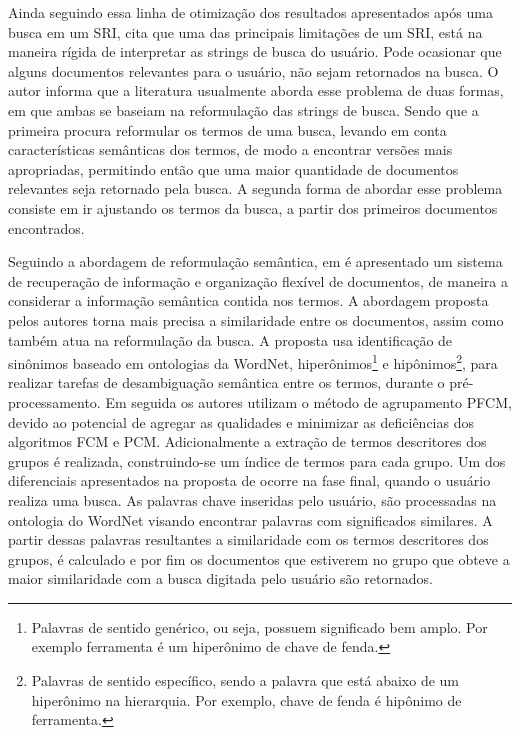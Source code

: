 Ainda seguindo essa linha de otimização dos resultados apresentados após uma busca em um SRI,
\cite{Nogueira2012} cita que uma das principais limitações de um SRI, está na maneira rígida de
interpretar as strings de busca do usuário. Pode ocasionar que alguns documentos relevantes
para o usuário, não sejam retornados na busca. O autor informa que a literatura usualmente aborda
esse problema de duas formas, em que ambas se baseiam na reformulação das strings de busca. Sendo
que a primeira procura reformular os termos de uma busca, levando em conta características
semânticas dos termos, de modo a encontrar versões mais apropriadas, permitindo então que uma maior
quantidade de documentos relevantes seja retornado pela busca. A segunda forma de abordar esse
problema consiste em ir ajustando os termos da busca, a partir dos primeiros documentos encontrados.

Seguindo a abordagem de reformulação semântica, em \cite{Murali2015} é apresentado um 
sistema de recuperação de informação e organização flexível de
documentos, de maneira a considerar a informação semântica contida nos termos. A abordagem proposta pelos autores torna
mais precisa a similaridade entre os documentos, assim como também atua na reformulação da busca. 
A proposta usa
identificação de sinônimos baseado em ontologias da WordNet, 
hiperônimos\footnote{Palavras de sentido genérico, ou seja, 
  possuem significado bem amplo. Por exemplo
ferramenta é um hiperônimo de chave de fenda.} 
e hipônimos\footnote{Palavras de sentido específico, sendo a palavra que está abaixo de um 
  hiperônimo na
hierarquia. Por exemplo, chave de fenda é hipônimo de ferramenta.}, para realizar tarefas de
desambiguação semântica entre os termos, durante o pré-processamento. Em seguida os autores utilizam
o método de agrupamento PFCM, devido ao potencial de agregar as qualidades e minimizar as
deficiências dos algoritmos FCM e PCM. Adicionalmente a extração de termos descritores dos grupos é
realizada, construindo-se um índice de termos para cada grupo. Um dos diferenciais apresentados na
proposta de \cite{Murali2015} ocorre na fase final, quando o usuário realiza uma busca. As palavras
chave inseridas pelo usuário, são processadas na ontologia do WordNet visando encontrar palavras
com significados similares. A partir dessas palavras resultantes a similaridade com os
termos descritores dos grupos, é calculado e por fim os documentos que estiverem no grupo que obteve a maior
similaridade com a busca digitada pelo usuário são retornados.

